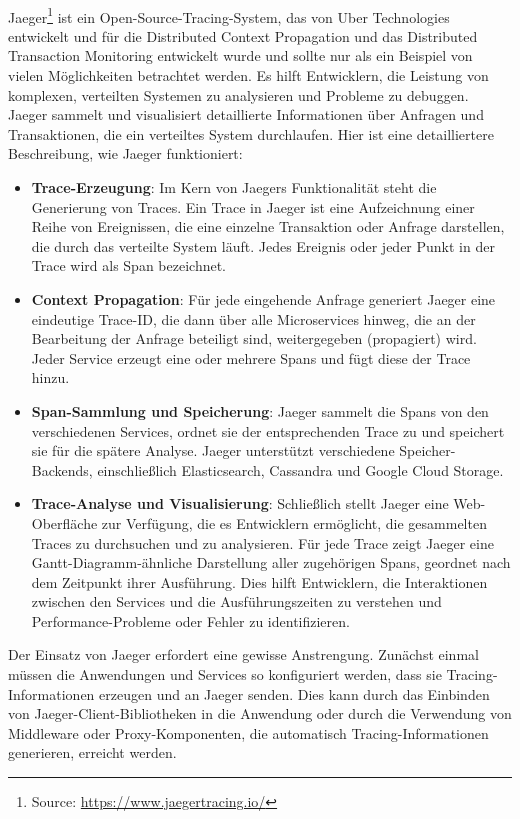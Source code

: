 \documentclass[../vs-script-first-v01.tex]{subfiles}
\begin{document}
\\
Jaeger\footnote{Source: \url{https://www.jaegertracing.io/}} ist ein Open-Source-Tracing-System, das von Uber Technologies entwickelt und für die Distributed Context Propagation und das Distributed Transaction Monitoring entwickelt wurde und sollte nur als ein Beispiel von vielen Möglichkeiten betrachtet werden. Es hilft Entwicklern, die Leistung von komplexen, verteilten Systemen zu analysieren und Probleme zu debuggen. Jaeger sammelt und visualisiert detaillierte Informationen über Anfragen und Transaktionen, die ein verteiltes System durchlaufen. Hier ist eine detailliertere Beschreibung, wie Jaeger funktioniert:
\begin{itemize}
\item \textbf{Trace-Erzeugung}: Im Kern von Jaegers Funktionalität steht die Generierung von Traces. Ein Trace in Jaeger ist eine Aufzeichnung einer Reihe von Ereignissen, die eine einzelne Transaktion oder Anfrage darstellen, die durch das verteilte System läuft. Jedes Ereignis oder jeder Punkt in der Trace wird als Span bezeichnet.

\item \textbf{Context Propagation}: Für jede eingehende Anfrage generiert Jaeger eine eindeutige Trace-ID, die dann über alle Microservices hinweg, die an der Bearbeitung der Anfrage beteiligt sind, weitergegeben (propagiert) wird. Jeder Service erzeugt eine oder mehrere Spans und fügt diese der Trace hinzu.

\item \textbf{Span-Sammlung und Speicherung}: Jaeger sammelt die Spans von den verschiedenen Services, ordnet sie der entsprechenden Trace zu und speichert sie für die spätere Analyse. Jaeger unterstützt verschiedene Speicher-Backends, einschließlich Elasticsearch, Cassandra und Google Cloud Storage.

\item \textbf{Trace-Analyse und Visualisierung}: Schließlich stellt Jaeger eine Web-Oberfläche zur Verfügung, die es Entwicklern ermöglicht, die gesammelten Traces zu durchsuchen und zu analysieren. Für jede Trace zeigt Jaeger eine Gantt-Diagramm-ähnliche Darstellung aller zugehörigen Spans, geordnet nach dem Zeitpunkt ihrer Ausführung. Dies hilft Entwicklern, die Interaktionen zwischen den Services und die Ausführungszeiten zu verstehen und Performance-Probleme oder Fehler zu identifizieren.
\end{itemize}
Der Einsatz von Jaeger erfordert eine gewisse Anstrengung. Zunächst einmal müssen die Anwendungen und Services so konfiguriert werden, dass sie Tracing-Informationen erzeugen und an Jaeger senden. Dies kann durch das Einbinden von Jaeger-Client-Bibliotheken in die Anwendung oder durch die Verwendung von Middleware oder Proxy-Komponenten, die automatisch Tracing-Informationen generieren, erreicht werden.
\end{document}
